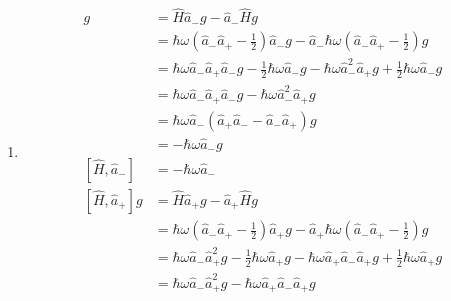 \documentclass{article}
\begin{document}
\begin{enumerate}
  \item

        \begin{align*}
          [\hat{H}, \hat{a}_-] g & = \hat{H} \hat{a}_- g - \hat{a}_- \hat{H} g                                                                                                                         \\
                                 & = \hbar \omega \left( \hat{a}_- \hat{a}_+ - \frac{1}{2} \right) \hat{a}_- g - \hat{a}_- \hbar \omega \left( \hat{a}_- \hat{a}_+ - \frac{1}{2} \right) g             \\
                                 & = \hbar \omega \hat{a}_- \hat{a}_+ \hat{a}_- g - \frac{1}{2} \hbar \omega \hat{a}_- g - \hbar \omega \hat{a}_-^2 \hat{a}_+ g + \frac{1}{2} \hbar \omega \hat{a}_- g \\
                                 & = \hbar \omega \hat{a}_- \hat{a}_+ \hat{a}_- g - \hbar \omega \hat{a}_-^2 \hat{a}_+ g                                                                               \\
                                 & = \hbar \omega \hat{a}_- (\hat{a}_+ \hat{a}_- - \hat{a}_- \hat{a}_+) g                                                                                              \\
                                 & = -\hbar \omega \hat{a}_- g                                                                                                                                         \\
          [\hat{H}, \hat{a}_-]   & = -\hbar \omega \hat{a}_-                                                                                                                                           \\
          [\hat{H}, \hat{a}_+] g & = \hat{H} \hat{a}_+ g - \hat{a}_+ \hat{H} g                                                                                                                         \\
                                 & = \hbar \omega \left( \hat{a}_- \hat{a}_+ - \frac{1}{2} \right) \hat{a}_+ g - \hat{a}_+ \hbar \omega \left( \hat{a}_- \hat{a}_+ - \frac{1}{2} \right) g             \\
                                 & = \hbar \omega \hat{a}_- \hat{a}_+^2 g - \frac{1}{2} \hbar \omega \hat{a}_+ g - \hbar \omega \hat{a}_+ \hat{a}_- \hat{a}_+ g + \frac{1}{2} \hbar \omega \hat{a}_+ g \\
                                 & = \hbar \omega \hat{a}_- \hat{a}_+^2 g - \hbar \omega \hat{a}_+ \hat{a}_- \hat{a}_+ g                                                                               \\

\end{align*}
\end{enumerate}
\end{document}
